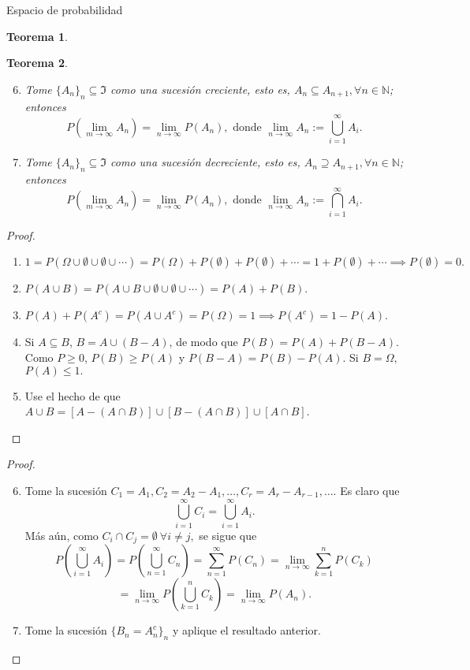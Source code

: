 \documentclass{beamer}
\newtheorem{theo}{Teorema}[section]
\begin{document}
\begin{frame}[allowframebreaks]{Espacio de probabilidad}
\begin{theo}
\begin{enumerate}
		\end{enumerate}
	\end{theo}
	\begin{theo}
	\begin{enumerate}
	\setcounter{enumi}{5}
		\item Tome $\{A_n\}_n\subseteq\Im$ como una sucesión creciente, esto es, $A_n\subseteq A_{n+1}, \forall n\in\mathbb{N}$; entonces
			$$P\left(\lim_{m\rightarrow\infty}A_n\right)=\lim_{n\rightarrow\infty}P(A_n), \text{ donde } \lim_{n\rightarrow\infty} A_n:=\bigcup_{i=1}^\infty A_i.$$
		\item Tome $\{A_n\}_n\subseteq\Im$ como una sucesión decreciente, esto es, $A_n\supseteq A_{n+1}, \forall n\in\mathbb{N}$; entonces
			$$P\left(\lim_{m\rightarrow\infty}A_n\right)=\lim_{n\rightarrow\infty}P(A_n), \text{ donde } \lim_{n\rightarrow\infty} A_n:=\bigcap_{i=1}^\infty A_i.$$
	\end{enumerate}
	\end{theo}
	\begin{proof}
		\begin{enumerate}
			\item $1=P(\Omega\cup\emptyset\cup\emptyset\cup\cdots)=P(\Omega)+P(\emptyset)+P(\emptyset)+\cdots=1+P(\emptyset)+\cdots \implies P(\emptyset)=0.$
			\item $P(A\cup B)=P(A\cup B\cup\emptyset\cup\emptyset\cup\cdots)=P(A)+P(B).$
			\item $P(A)+P(A^c)=P(A\cup A^c)=P(\Omega)=1\implies P(A^c)=1-P(A).$
			\item Si $A\subseteq B$, $B=A\cup(B-A)$, de modo que $P(B)=P(A)+P(B-A).$ Como $P\geq0$, $P(B)\geq P(A)$ y $P(B-A)=P(B)-P(A).$ Si $B=\Omega,$ $P(A)\leq1.$
			\item Use el hecho de que $A\cup B=[A-(A\cap B)]\cup[B-(A\cap B)]\cup[A\cap B]$.			
		\end{enumerate}
		
	\end{proof}
	\begin{proof}
		\begin{enumerate}
		\setcounter{enumi}{5}
			\item Tome la sucesión $C_1=A_1,C_2=A_2-A_1,\dots,C_r=A_r-A_{r-1},\dots$. Es claro que
			$$\bigcup_{i=1}^\infty C_i=\bigcup_{i=1}^\infty A_i.$$
			Más aún, como $C_i\cap C_j=\emptyset\ \forall i\neq j,$ se sigue que
			$$P\left(\bigcup_{i=1}^\infty A_i\right)=P\left(\bigcup_{n=1}^\infty C_n\right)=\sum_{n=1}^\infty P(C_n)=\lim_{n\rightarrow\infty} \sum_{k=1}^n P(C_k)$$ $$=\lim_{n\rightarrow\infty}P\left(\bigcup_{k=1}^n C_k\right)=\lim_{n\rightarrow\infty}P\left(A_n\right).$$
			\item Tome la sucesión $\{B_n=A_n^c\}_n$ y aplique el resultado anterior.
		\end{enumerate}
	\end{proof}
	\end{frame}
	
\end{document}
